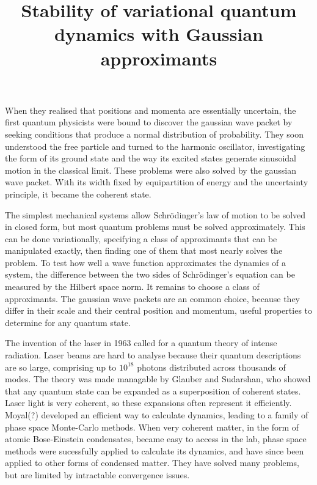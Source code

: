 \nonstopmode


 \tenrm

\title{Stability of variational quantum dynamics with Gaussian approximants}

\def\G{|Γ〉}
\def\Gx{|Γ_χ〉}
\def\cite#1{$[\hbox{\tt #1}]$}


When they realised that positions and momenta are essentially uncertain, the first quantum physicists were bound to discover the gaussian wave packet by seeking conditions that produce a normal distribution of probability.  They soon understood the free particle and turned to the harmonic oscillator, investigating the form of its ground state and the way its excited states generate sinusoidal motion in the classical limit.  These problems were also solved by the gaussian wave packet.  With its width fixed by equipartition of energy and the uncertainty principle, it became the coherent state.

The simplest mechanical systems allow Schrödinger's law of motion to be solved in closed form, but most quantum problems must be solved approximately.  This can be done variationally, specifying a class of approximants that can be manipulated exactly, then finding one of them that most nearly solves the problem.  To test how well a wave function approximates the dynamics of a system, the difference between the two sides of Schrödinger's equation can be measured by the Hilbert space norm.  It remains to choose a class of approximants.  The gaussian wave packets are an common choice, because they differ in their scale and their central position and momentum, useful properties to determine for any quantum state.

The invention of the laser in 1963 called for a quantum theory of intense radiation.  Laser beams are hard to analyse because their quantum descriptions are so large, comprising up to $10^{18}$ photons distributed across thousands of modes.  The theory was made managable by Glauber and Sudarshan, who showed that any quantum state can be expanded as a superposition of coherent states.  Laser light is very coherent, so these expansions often represent it efficiently.  Moyal(?) developed an efficient way to calculate dynamics, leading to a family of phase space Monte-Carlo methods.  When very coherent matter, in the form of atomic Bose-Einstein condensates, became easy to access in the lab, phase space methods were sucessfully applied to calculate its dynamics, and have since been applied to other forms of condensed matter.  They have solved many problems, but are limited by intractable convergence issues.

